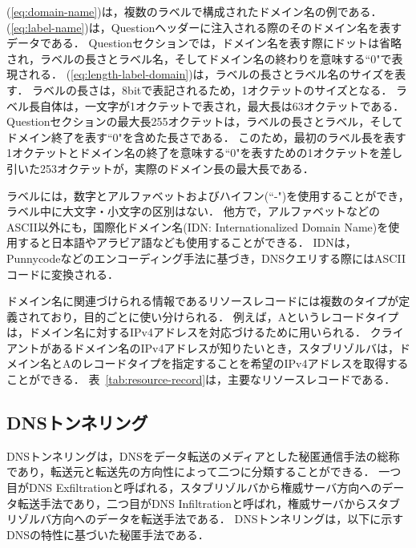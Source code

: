 (\ref{eq:domain-name})は，複数のラベルで構成されたドメイン名の例である．
(\ref{eq:label-name})は，Questionヘッダーに注入される際のそのドメイン名を表すデータである．
Questionセクションでは，ドメイン名を表す際にドットは省略され，ラベルの長さとラベル名，そしてドメイン名の終わりを意味する``0"で表現される．
(\ref{eq:length-label-domain})は，ラベルの長さとラベル名のサイズを表す．
ラベルの長さは，8bitで表記されるため，1オクテットのサイズとなる．
ラベル長自体は，一文字が1オクテットで表され，最大長は63オクテットである．
Questionセクションの最大長255オクテットは，ラベルの長さとラベル，そしてドメイン終了を表す``0"を含めた長さである．
このため，最初のラベル長を表す1オクテットとドメイン名の終了を意味する``0"を表すための1オクテットを差し引いた253オクテットが，実際のドメイン長の最大長である．


ラベルには，数字とアルファベットおよびハイフン(``-")を使用することができ，ラベル中に大文字・小文字の区別はない．
他方で，アルファベットなどのASCII以外にも，国際化ドメイン名(IDN: Internationalized Domain Name)を使用すると日本語やアラビア語なども使用することができる．
IDNは，Punnycodeなどのエンコーディング手法に基づき，DNSクエリする際にはASCIIコードに変換される．

ドメイン名に関連づけられる情報であるリソースレコードには複数のタイプが定義されており，目的ごとに使い分けられる．
例えば，Aというレコードタイプは，ドメイン名に対するIPv4アドレスを対応づけるために用いられる．
クライアントがあるドメイン名のIPv4アドレスが知りたいとき，スタブリゾルバは，ドメイン名とAのレコードタイプを指定することを希望のIPv4アドレスを取得することができる．
表~\ref{tab:resource-record}は，主要なリソースレコードである．




\subsection{DNSトンネリング}
\label{sec:dns-tunneling}
DNSトンネリングは，DNSをデータ転送のメディアとした秘匿通信手法の総称であり，転送元と転送先の方向性によって二つに分類することができる．
一つ目がDNS Exfiltrationと呼ばれる，スタブリゾルバから権威サーバ方向へのデータ転送手法であり，二つ目がDNS Infiltrationと呼ばれ，権威サーバからスタブリゾルバ方向へのデータを転送手法である．
DNSトンネリングは，以下に示すDNSの特性に基づいた秘匿手法である．

